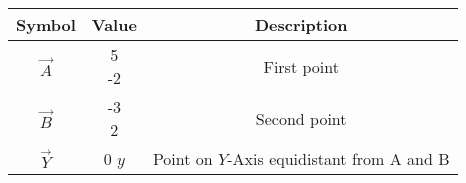 \begin{tabular}[12pt]{ |c|c|c|}
    \hline
    \textbf{Symbol} & \textbf{Value} & \textbf{Description} \\
    \hline
    $\vec{A}$ & \myvec{5\\-2} & First point\\
    \hline 
    $\vec{B}$ & \myvec{-3\\2} & Second point\\
    \hline
    $\vec{Y}$ & \myvec{0\\$y$} & Point on $Y$-Axis equidistant from A and B\\
    \hline
    \end{tabular}
